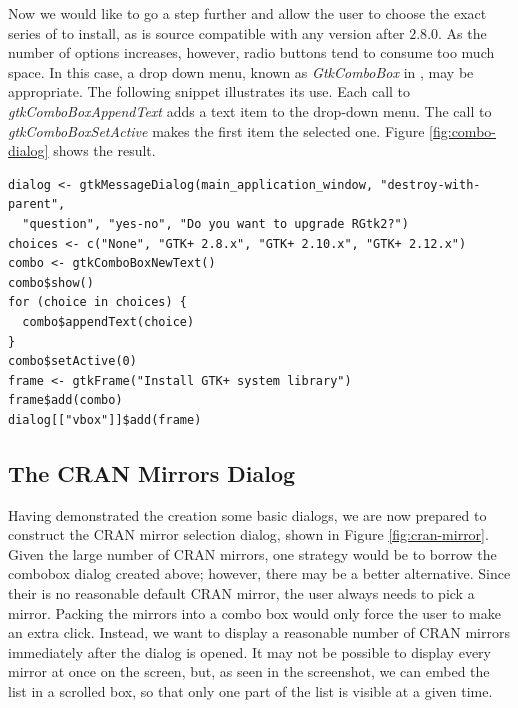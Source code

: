 \documentclass[article]{jss}
\begin{document}
Now we would like to go a step further and allow the user to choose the
exact series of  to install, as  is source compatible with 
any version after $2.8.0$. As the number of options increases, however, radio 
buttons tend to consume too much space. In this case, a drop down menu, known 
as \emph{GtkComboBox} in , may be appropriate. The following snippet 
illustrates its use. Each call to \emph{gtkComboBoxAppendText} adds a text item
to the drop-down menu. The call to \emph{gtkComboBoxSetActive} makes the first 
item the selected one. Figure \ref{fig:combo-dialog} shows the result.
\begin{verbatim}
dialog <- gtkMessageDialog(main_application_window, "destroy-with-parent", 
  "question", "yes-no", "Do you want to upgrade RGtk2?")
choices <- c("None", "GTK+ 2.8.x", "GTK+ 2.10.x", "GTK+ 2.12.x")
combo <- gtkComboBoxNewText()
combo$show()
for (choice in choices) {
  combo$appendText(choice)
}
combo$setActive(0)
frame <- gtkFrame("Install GTK+ system library")
frame$add(combo)
dialog[["vbox"]]$add(frame)
\end{verbatim}

\subsection{The CRAN Mirrors Dialog}

Having demonstrated the creation some basic dialogs, we are now prepared to 
construct the CRAN mirror selection dialog, shown
in Figure \ref{fig:cran-mirror}.
Given the large number of CRAN mirrors, one strategy would be to 
borrow the combobox dialog created above; however, there may be a better 
alternative. Since their is no reasonable default CRAN mirror, the user always
needs to pick a mirror. Packing the mirrors into a combo box would only force 
the user to make an extra click. Instead, we want to display a reasonable
number of CRAN mirrors immediately after the dialog is opened. It may
not be possible to display every mirror at once on the screen, but, as seen
in the screenshot, we can embed the list in a scrolled box, so that only
one part of the list is visible at a given time.
\end{document}
